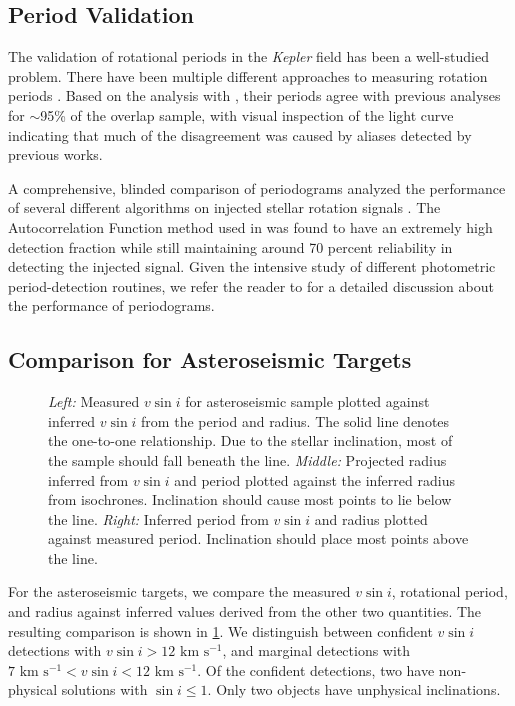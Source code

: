 \documentclass[manuscript]{aastex6}
\newcommand{\vsini}{\ensuremath{v \sin i}}
\newcommand{\Kepler}{\mbox{\textit{Kepler}}}
\newcommand{\kms}{\textrm{ km~s}\ensuremath{^{-1}}}
\begin{document}
\subsection{Period Validation}

The validation of rotational periods in the \Kepler{} field has been a
well-studied problem. There have been multiple different approaches to
measuring rotation periods \citep{Reinhold13,Nielsen13,McQuillan14,Garcia14}.
Based on the analysis with \citet{McQuillan14}, their periods agree with
previous analyses for \(\sim\)95\% of the overlap sample, with visual 
inspection of the light curve indicating that much of the disagreement was 
caused by aliases detected by previous works. 

A comprehensive, blinded comparison of periodograms analyzed the performance of
several different algorithms on injected stellar rotation signals 
\citep{Aigrain15}. The Autocorrelation Function method used in \citet{McQuillan14} was 
found to have an extremely high detection fraction while still maintaining 
around 70 percent reliability in detecting the injected signal. Given the 
intensive study of different photometric period-detection routines, we refer 
the reader to \citet{Aigrain15} for a detailed discussion about the 
performance of periodograms.

\subsection{Comparison for Asteroseismic Targets}
\label{sec:astero}

\begin{figure}
    \caption{\emph{Left:} Measured \vsini{} for asteroseismic sample plotted
        against inferred \vsini{} from the period and radius. The solid line 
        denotes the one-to-one relationship. Due to the stellar inclination, most
        of the sample should fall beneath the line. \emph{Middle:} Projected
        radius inferred from \vsini{} and period plotted against the inferred
        radius from isochrones. Inclination should cause most points to lie
        below the line. \emph{Right:} Inferred period from \vsini{} and radius
        plotted against measured period. Inclination should place most points
    above the line.\label{fig:astero_rot}}
\end{figure}

For the asteroseismic targets, we compare the measured \vsini{}, rotational 
period, and radius against inferred values derived from
the other two quantities. The resulting comparison is shown in
\cref{fig:astero_rot}. We distinguish between confident \vsini{} detections
with \(\vsini > 12 \kms\), and marginal detections with \(7 \kms < \vsini < 12
\kms\). Of the confident detections, two  
have non-physical solutions with \(\sin i \le 1\). Only two objects have
unphysical inclinations.
\end{document}
